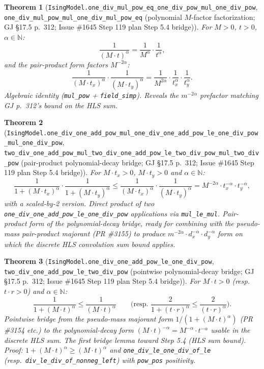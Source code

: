 \documentclass[a4paper,11pt]{article}
\newtheorem{theorem}{Theorem}
\begin{document}
\begin{theorem}[\texttt{IsingModel.one\_div\_mul\_pow\_eq\_one\_div\_pow\_mul\_one\_div\_pow},
\texttt{one\_div\_mul\_pow\_mul\_one\_div\_mul\_pow\_eq}
(polynomial $M$-factor factorization; GJ \S17.5 p.~312; Issue \#1645 Step 119 plan Step 5.4
bridge)]
For $M > 0$, $t > 0$, $\alpha \in \mathbb{N}$:
\[
  \frac{1}{(M\cdot t)^\alpha} = \frac{1}{M^\alpha}\cdot\frac{1}{t^\alpha},
\]
and the pair-product form factors $M^{-2\alpha}$:
\[
  \frac{1}{(M\cdot t_x)^\alpha}\cdot\frac{1}{(M\cdot t_y)^\alpha}
    = \frac{1}{M^{2\alpha}}\cdot\frac{1}{t_x^\alpha}\cdot\frac{1}{t_y^\alpha}.
\]
Algebraic identity (\texttt{mul\_pow} + \texttt{field\_simp}). Reveals the $m^{-2\alpha}$
prefactor matching GJ p.~312's bound on the HLS sum.
\end{theorem}

\begin{theorem}[\texttt{IsingModel.one\_div\_one\_add\_pow\_mul\_one\_div\_one\_add\_pow\_le\_one\_div\_pow\_mul\_one\_div\_pow},
\texttt{two\_div\_one\_add\_pow\_mul\_two\_div\_one\_add\_pow\_le\_two\_div\_pow\_mul\_two\_div\_pow}
(pair-product polynomial-decay bridge; GJ \S17.5 p.~312; Issue \#1645 Step 119 plan Step 5.4
bridge)]
For $M\cdot t_x > 0$, $M\cdot t_y > 0$ and $\alpha\in\mathbb{N}$:
\[
  \frac{1}{1+(M\cdot t_x)^\alpha}\cdot\frac{1}{1+(M\cdot t_y)^\alpha}
    \le \frac{1}{(M\cdot t_x)^\alpha}\cdot\frac{1}{(M\cdot t_y)^\alpha}
    = M^{-2\alpha}\cdot t_x^{-\alpha}\cdot t_y^{-\alpha},
\]
with a scaled-by-2 version. Direct product of two
\texttt{one\_div\_one\_add\_pow\_le\_one\_div\_pow} applications via \texttt{mul\_le\_mul}.
Pair-product form of the polynomial-decay bridge, ready for combining with the pseudo-mass
pair-product majorant (PR \#3155) to produce $m^{-2\alpha}\cdot d_x^{-\alpha}\cdot d_y^{-\alpha}$
form on which the discrete HLS convolution sum bound applies.
\end{theorem}

\begin{theorem}[\texttt{IsingModel.one\_div\_one\_add\_pow\_le\_one\_div\_pow},
\texttt{two\_div\_one\_add\_pow\_le\_two\_div\_pow}
(pointwise polynomial-decay bridge; GJ \S17.5 p.~312; Issue \#1645 Step 119 plan Step 5.4
bridge)]
For $M\cdot t > 0$ (resp.\ $t\cdot r > 0$) and $\alpha \in \mathbb{N}$:
\[
  \frac{1}{1 + (M\cdot t)^\alpha} \le \frac{1}{(M\cdot t)^\alpha}
  \qquad\text{(resp.\ }
  \frac{2}{1 + (t\cdot r)^\alpha} \le \frac{2}{(t\cdot r)^\alpha}\text{)}.
\]
Pointwise bridge from the pseudo-mass majorant form $1/(1+(M\cdot t)^\alpha)$ (PR \#3154 etc.) to
the polynomial-decay form $(M\cdot t)^{-\alpha} = M^{-\alpha}\cdot t^{-\alpha}$ usable in the
discrete HLS sum. The first bridge lemma toward Step 5.4 (HLS sum bound). Proof:
$1 + (M\cdot t)^\alpha \ge (M\cdot t)^\alpha$ and \texttt{one\_div\_le\_one\_div\_of\_le}
(resp.\ \texttt{div\_le\_div\_of\_nonneg\_left}) with \texttt{pow\_pos} positivity.
\end{theorem}
\end{document}
